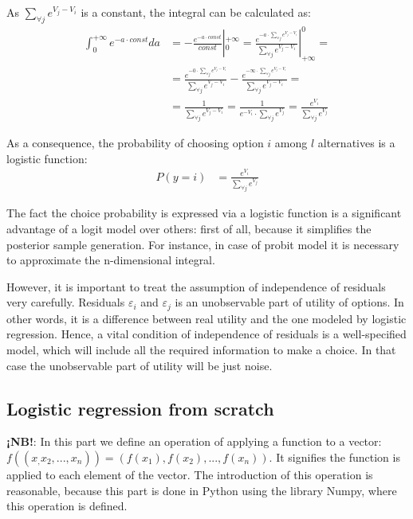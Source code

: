 \documentclass[a4paper, 12pt]{extreport}
\begin{document}
As $\sum_{\forall j}e^{V_j - V_i}$ is a constant, the integral can be calculated as:
\begin{align}
	\int_{0}^{+\infty} e^{-a \cdot const} da &= -\frac{e^{-a \cdot const}}{const}|_0^{+\infty} = \frac{e^{-a \cdot \sum_{\forall j}e^{V_j - V_i}}}{\sum_{\forall j}e^{V_j - V_i}}|_{+\infty}^0 = \nonumber \\
	&= \frac{e^{-0 \cdot \sum_{\forall j}e^{V_j - V_i}}}{\sum_{\forall j}e^{V_j - V_i}} - \frac{e^{-\infty \cdot \sum_{\forall j}e^{V_j - V_i}}}{\sum_{\forall j}e^{V_j - V_i}} = \nonumber \\
	&= \frac{1}{\sum_{\forall j}e^{V_j - V_i}} = \frac{1}{e^{-V_i} \cdot \sum_{\forall j}e^{V_j}} = \frac{e^{V_i}}{\sum_{\forall j}e^{V_j}}
\end{align}

As a consequence, the probability of choosing option $i$ among $l$ alternatives is a logistic function:
\begin{align}
	P(y = i) &= \frac{e^{V_i}}{\sum_{\forall j}e^{V_j}}
\end{align}

The fact the choice probability is expressed via a logistic function is a significant advantage of a logit model over others: first of all, because it simplifies the posterior sample generation.
For instance, in case of probit model it is necessary to approximate the n-dimensional integral.

However, it is important to treat the assumption of independence of residuals very carefully. Residuals $\varepsilon_i$ and $\varepsilon_j$ is an unobservable part of utility of options. In other words,
it is a difference between real utility and the one modeled by logistic regression. Hence, a vital condition of independence of residuals is a well-specified model, which will include
all the required information to make a choice. In that case the unobservable part of utility will be just noise.

\subsection{Logistic regression from scratch}
\textbf{¡NB!}: In this part we define an operation of applying a function to a vector: $f((x_, x_2, ..., x_n)) = (f(x_1), f(x_2), ..., f(x_n))$. It signifies the function is applied to each element of the vector. The introduction of this operation is reasonable, because
this part is done in Python using the library Numpy, where this operation is defined.
\end{document}
